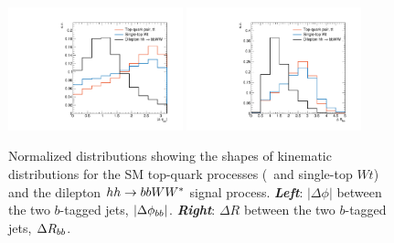 \begin{figure}[!htb]
    \begin{center}
        \includegraphics[width=0.45\textwidth]{figures/search_hh/signal_pheno/shape_plots/hh_shape_plot_dphi_bb}
        \includegraphics[width=0.45\textwidth]{figures/search_hh/signal_pheno/shape_plots/hh_shape_plot_dRbb}
        \caption{
            Normalized distributions showing the shapes of kinematic distributions for the SM
            top-quark processes (\ttbar~and single-top $Wt$) and the dilepton $hh \rightarrow bbWW^*$ signal process.
            \textit{\textbf{Left}}: $|\Delta \phi|$ between the two $b$-tagged jets, $|\Delta \phi_{bb}|$.
            \textit{\textbf{Right}}: $\Delta R$ between the two $b$-tagged jets, $\Delta R_{bb}$.
        }
        \label{fig:hh_kin_0}
    \end{center}
\end{figure}


